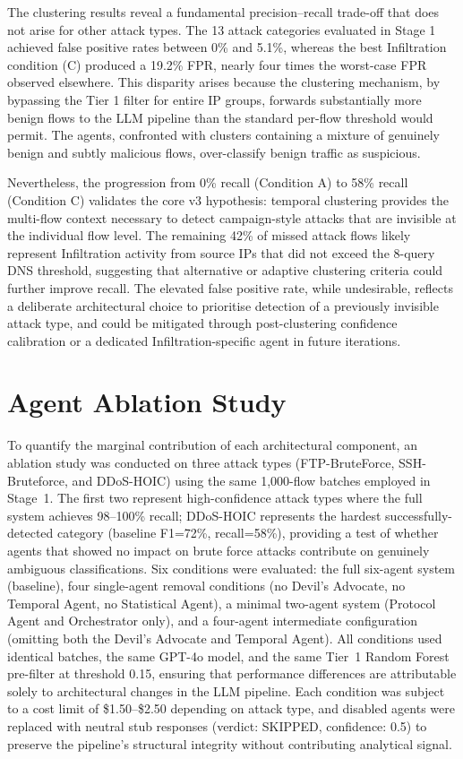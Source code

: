The clustering results reveal a fundamental precision--recall trade-off that does not arise for other attack types. The 13 attack categories evaluated in Stage 1 achieved false positive rates between 0\% and 5.1\%, whereas the best Infiltration condition (C) produced a 19.2\% FPR, nearly four times the worst-case FPR observed elsewhere. This disparity arises because the clustering mechanism, by bypassing the Tier 1 filter for entire IP groups, forwards substantially more benign flows to the LLM pipeline than the standard per-flow threshold would permit. The agents, confronted with clusters containing a mixture of genuinely benign and subtly malicious flows, over-classify benign traffic as suspicious.

Nevertheless, the progression from 0\% recall (Condition A) to 58\% recall (Condition C) validates the core v3 hypothesis: temporal clustering provides the multi-flow context necessary to detect campaign-style attacks that are invisible at the individual flow level. The remaining 42\% of missed attack flows likely represent Infiltration activity from source IPs that did not exceed the 8-query DNS threshold, suggesting that alternative or adaptive clustering criteria could further improve recall. The elevated false positive rate, while undesirable, reflects a deliberate architectural choice to prioritise detection of a previously invisible attack type, and could be mitigated through post-clustering confidence calibration or a dedicated Infiltration-specific agent in future iterations.

\section{Agent Ablation Study}
\label{sec:agent-ablation}

To quantify the marginal contribution of each architectural component, an ablation study was conducted on three attack types (FTP-BruteForce, SSH-Bruteforce, and DDoS-HOIC) using the same 1{,}000-flow batches employed in Stage~1. The first two represent high-confidence attack types where the full system achieves 98--100\% recall; DDoS-HOIC represents the hardest successfully-detected category (baseline F1=72\%, recall=58\%), providing a test of whether agents that showed no impact on brute force attacks contribute on genuinely ambiguous classifications. Six conditions were evaluated: the full six-agent system (baseline), four single-agent removal conditions (no Devil's Advocate, no Temporal Agent, no Statistical Agent), a minimal two-agent system (Protocol Agent and Orchestrator only), and a four-agent intermediate configuration (omitting both the Devil's Advocate and Temporal Agent). All conditions used identical batches, the same GPT-4o model, and the same Tier~1 Random Forest pre-filter at threshold 0.15, ensuring that performance differences are attributable solely to architectural changes in the LLM pipeline. Each condition was subject to a cost limit of \$1.50--\$2.50 depending on attack type, and disabled agents were replaced with neutral stub responses (verdict: SKIPPED, confidence: 0.5) to preserve the pipeline's structural integrity without contributing analytical signal.


